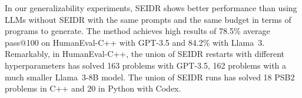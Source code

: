In our generalizability experiments, SEIDR shows better performance than using LLMs without SEIDR with the same prompts and the same budget in terms of programs to generate.
The method achieves high results of 78.5\% average pass@100 on HumanEval-C++ with GPT-3.5 and 84.2\% with Llama~3.
Remarkably, in HumanEval-C++, the union of SEIDR restarts with different hyperparameters has solved 163 problems with GPT-3.5, 162 problems with a much smaller Llama~3-8B model.
The union of SEIDR runs has solved 18 PSB2 problems in C++ and 20 in Python with Codex. 
